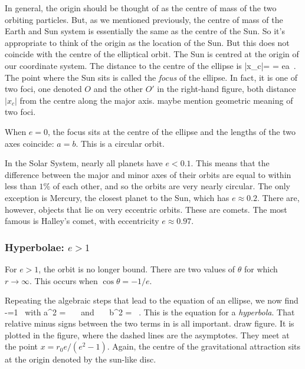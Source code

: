 \para
In general, the origin should be thought of as the centre of mass of the two orbiting particles. But, as we mentioned previously, the centre of mass of the Earth and Sun system is essentially the same as the centre of the Sun.  So it's appropriate to think of the origin as the location of the Sun. But this does not coincide with the centre of the elliptical orbit.  {\co The Sun is centred at the origin of our coordinate system. The distance to the centre of the ellipse is
%
\be |x_c|= = ea\ .\ee
%
The point where the Sun sits is called the {\it focus} of the ellipse.} In fact, it is one of two foci, one denoted $O$ and the other $O'$ in the right-hand figure, both distance $|x_c|$ from the centre along the major axis.  {\cblue maybe mention geometric meaning of two foci.}

\para
{\co When $e=0$, the focus sits at the centre of the ellipse and the lengths of the two axes coincide: $a=b$. This is a circular orbit.} 

\para
{\co In the Solar System, nearly all planets have $e<0.1$. This means that the difference between the major and minor axes of their orbits are equal to within less than $1\%$ of each other, and so the orbits are very nearly circular. The only exception is Mercury, the closest planet to the Sun, which has $e\approx 0.2$.  There are, however, objects that lie on very eccentric orbits. These are comets. The most famous is Halley's comet, with  eccentricity $e\approx 0.97$.




\subsubsection*{Hyperbolae: $e>1$}



For $e>1$, the orbit is no longer bound. There  are two values of $\theta$ for which $r\rightarrow \infty$. This occurs when  $\cos\theta = -1/e$.} Repeating the algebraic steps that lead to the equation of an ellipse, {\co we now find
%
\be {}-=1\ \label{hyperbola}\ee
%
 with 
 \be a^2 =  \ \ \ {\rm and} \ \ \ b^2 = \ .\ee
 This is the equation for a {\it hyperbola}.}
That relative minus signs between the two terms in  is all important. {\cblue draw figure}. It is plotted in the figure, where the dashed lines are the asymptotes. They meet at the point $x=r_0e/(e^2-1)$. Again, the centre of the gravitational attraction sits at the origin denoted by the sun-like disc. 

